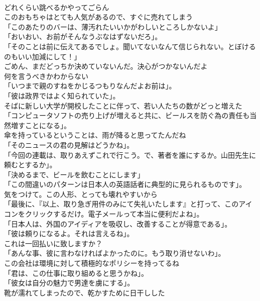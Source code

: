 \documentclass[8pt]{extreport}
\begin{document}
\begin{CJK}{UTF8}{min}
\\	どれくらい跳べるかやってごらん	
\\	このおもちゃはとても人気があるので、すぐに売れてしまう	
\\	「このあたりのバーは、薄汚れたいいかがわしいところしかないよ」	
\\	「おいおい、お前がそんなうぶなはずないだろ」。	
\\	「そのことは前に伝えてあるでしょ。聞いてないなんて信じられない。とぼけるのもいい加減にして！」	
\\	ごめん、まだどっちか決めていないんだ。決心がつかないんだよ	
\\	何を言うべきかわからない	
\\	「いつまで親のすねをかじるつもりなんだよお前は」。	
\\	「彼は政界ではよく知られていた」。	
\\	そばに新しい大学が開校したことに伴って、若い人たちの数がどっと増えた	
\\	「コンピュータソフトの売り上げが増えると共に、ビールスを防ぐ為の責任も当然増すことになる」。	
\\	傘を持っているということは、雨が降ると思ってたんだね	
\\	「そのニュースの君の見解はどうかね」。	
\\	「今回の連載は、取りあえずこれで行こう。で、著者を誰にするか。山田先生に頼むとするか」。	
\\	「決めるまで、ビールを飲むことにします」	
\\	「この間違いのパターンは日本人の英語話者に典型的に見られるものです」。	
\\	気をつけて。この人形、とっても壊れやすいから	
\\	「最後に、『以上、取り急ぎ用件のみにて失礼いたします』と打って、このアイコンをクリックするだけ。電子メールって本当に便利だよね」。	
\\	「日本人は、外国のアイディアを吸収し、改善することが得意である」。	
\\	「彼は頼りになるよ。それは言えるね」。	
\\	これは一回払いに致しますか？	
\\	「あんな事、彼に言わなければよかったのに。もう取り消せないわ」。	
\\	この会社は環境に対して積極的なポリシーを持ってるね	
\\	「君は、この仕事に取り組めると思うかね」。	
\\	「彼女は自分の魅力で男達を虜にする」。	
\\	靴が濡れてしまったので、乾かすために日干しした	

\end{CJK}
\end{document}
